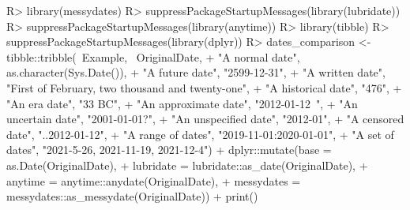 \documentclass[
]{jss}
\begin{document}
\begin{CodeChunk}
\begin{CodeInput}
R> library(messydates)
R> suppressPackageStartupMessages(library(lubridate))
R> suppressPackageStartupMessages(library(anytime))
R> library(tibble)
R> suppressPackageStartupMessages(library(dplyr))
R> dates_comparison <- tibble::tribble(~Example, ~OriginalDate,
+                                     "A normal date", as.character(Sys.Date()),
+                                     "A future date", "2599-12-31",
+                                     "A written date", "First of February, two thousand and twenty-one",
+                                     "A historical date", "476",
+                                     "An era date", "33 BC",
+                                     "An approximate date", "2012-01-12~",
+                                     "An uncertain date", "2001-01-01?",
+                                     "An unspecified date", "2012-01",
+                                     "A censored date", "..2012-01-12", 
+                                     "A range of dates", "2019-11-01:2020-01-01",
+                                     "A set of dates", "2021-5-26, 2021-11-19, 2021-12-4") %
+   dplyr::mutate(base = as.Date(OriginalDate),
+                 lubridate = lubridate::as_date(OriginalDate),
+                 anytime = anytime::anydate(OriginalDate),
+                 messydates = messydates::as_messydate(OriginalDate)) %
+   print()
\end{CodeInput}
\begin{CodeOutput}
# A tibble: 11 x 6
   Example             OriginalDate  base       lubridate  anytime    messydates
   <chr>               <chr>         <date>     <date>     <date>     <mdate>   
 1 A normal date       2022-06-15    2022-06-15 2022-06-15 2022-06-15 2022-06-1~
 2 A future date       2599-12-31    2599-12-31 2599-12-31 2599-12-31 2599-12-3~
 3 A written date      First of Feb~ NA         NA         NA         2021-02-0~
 4 A historical date   476           NA         NA         NA         0476     ~
 5 An era date         33 BC         NA         NA         NA         -0033    ~
 6 An approximate date 2012-01-12~   2012-01-12 2012-01-12 2012-01-12 2012-01-1~
 7 An uncertain date   2001-01-01?   2001-01-01 2001-01-01 2001-01-01 2001-01-0~
 8 An unspecified date 2012-01       NA         2020-12-01 2012-01-01 2012-01  ~
 9 A censored date     ..2012-01-12  NA         2012-01-12 NA         ..2012-01~
10 A range of dates    2019-11-01:2~ 2019-11-01 2019-11-01 2019-11-01 2019-11-0~
11 A set of dates      2021-5-26, 2~ 2021-05-26 NA         2021-05-26 {2021-05-~
\end{CodeOutput}
\end{CodeChunk}
\end{document}
